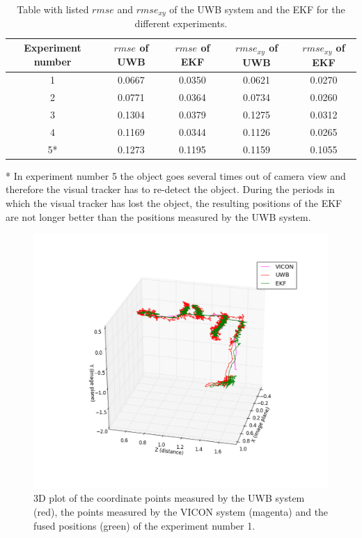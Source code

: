 \begin{table}[ht!]
\begin{center}
\begin{tabular}{c|c|c|c|c}
	Experiment number & $\textit{rmse}$ of \ac{UWB} & $\textit{rmse}$ of \ac{EKF} & $\textit{rmse}_{xy}$ of \ac{UWB} & $\textit{rmse}_{xy}$ of \ac{EKF}\\ 
	\hline 
	1 & 0.0667 & 0.0350 & 0.0621 & 0.0270 \\
	2 & 0.0771 & 0.0364 & 0.0734 & 0.0260 \\
	3 & 0.1304 & 0.0379 & 0.1275 & 0.0312 \\
	4 & 0.1169 & 0.0344 & 0.1126 & 0.0265 \\
	5* & 0.1273 & 0.1195 & 0.1159 & 0.1055
\end{tabular}
\end{center}
\caption{Table with listed $\textit{rmse}$ and $\textit{rmse}_{xy}$ of the \ac{UWB} system and the \ac{EKF} for the different experiments.}
\label{tab:results}
\end{table}

* In experiment number 5 the object goes several times out of camera view and therefore the visual tracker has to re-detect the object. During the periods in which the visual tracker has lost the object, the resulting positions of the \ac{EKF} are not longer better than the positions measured by the \ac{UWB} system.

\begin{figure}[ht!]\centering
	\includegraphics[width=1.0\textwidth]{figures/evaluation}
	\caption{3D plot of the coordinate points measured by the \ac{UWB} system (red), the points measured by the VICON system (magenta) and the fused positions (green) of the experiment number 1.}\label{fig:evaluation}
\end{figure}


